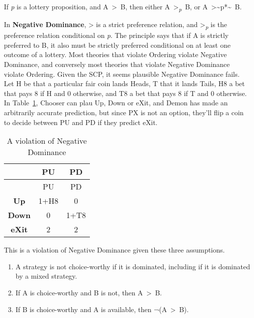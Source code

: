 \documentclass[
  10pt,
  letterpaper,
  DIV=11,
  numbers=noendperiod,
  twoside]{scrartcl}
\providecommand{\tightlist}{%
  \setlength{\itemsep}{0pt}\setlength{\parskip}{0pt}}\usepackage{longtable,booktabs,array}
\begin{document}
\begin{description}
\tightlist
\item[Negative Dominance]
If \emph{p} is a lottery proposition, and A~\textgreater~B, then either
A~\textgreater{}\textsubscript{\emph{p}}~B, or
A~\textgreater\textasciitilde{}\neg *p*\textasciitilde~B.
\end{description}

In \textbf{Negative Dominance}, \textgreater{} is a strict preference
relation, and \textgreater{}\textsubscript{\emph{p}} is the preference
relation conditional on \emph{p}. The principle says that if A is
strictly preferred to B, it also must be strictly preferred conditional
on at least one outcome of a lottery. Most theories that violate
Ordering violate Negative Dominance, and conversely most theories that
violate Negative Dominance violate Ordering. Given the SCP, it seems
plausible Negative Dominance fails. Let H be that a particular fair coin
lands Heads, T that it lands Tails, H8 a bet that pays 8 if H and 0
otherwise, and T8 a bet that pays 8 if T and 0 otherwise. In
Table~\ref{tbl-negdom}, Chooser can plau Up, Down or eXit, and Demon has
made an arbitrarily accurate prediction, but since PX is not an option,
they'll flip a coin to decide between PU and PD if they predict eXit.

\begin{longtable}[]{@{}ccc@{}}
\caption{A violation of Negative
Dominance}\label{tbl-negdom}\tabularnewline
\toprule\noalign{}
& PU & PD \\
\midrule\noalign{}
\endfirsthead
\toprule\noalign{}
& PU & PD \\
\midrule\noalign{}
\endhead
\bottomrule\noalign{}
\endlastfoot
\textbf{Up} & 1+H8 & 0 \\
\textbf{Down} & 0 & 1+T8 \\
\textbf{eXit} & 2 & 2 \\
\end{longtable}

This is a violation of Negative Dominance given these three assumptions.

\begin{enumerate}
\def\labelenumi{\arabic{enumi}.}
\tightlist
\item
  A strategy is not choice-worthy if it is dominated, including if it is
  dominated by a mixed strategy.
\item
  If A is choice-worthy and B is not, then A~\textgreater~B.
\item
  If B is choice-worthy and A is available, then ¬(A~\textgreater~B).
\end{enumerate}
\end{document}
